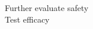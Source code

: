 \documentclass[preview]{standalone}
\begin{document}
Further evaluate safety\\Test efficacy\\
\end{document}
